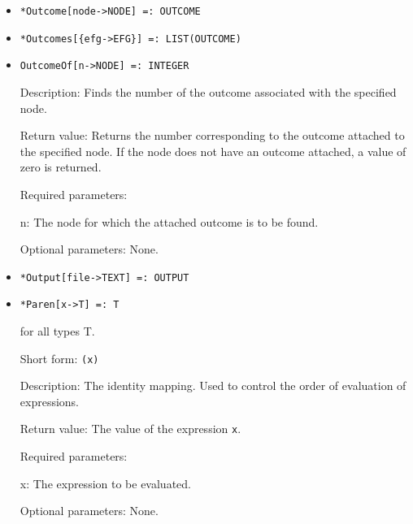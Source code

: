 \begin{itemize}
\item
\protect \large \begin{verbatim}
*Outcome[node->NODE] =: OUTCOME
\end{verbatim}\normalsize

\item
\protect \large \begin{verbatim}
*Outcomes[{efg->EFG}] =: LIST(OUTCOME)
\end{verbatim}\normalsize



\item
\protect \large \begin{verbatim}
OutcomeOf[n->NODE] =: INTEGER
\end{verbatim}\normalsize

\bd

\item
[Description:] Finds the number of the outcome associated with the
specified node.
\item
[Return value:] Returns the number corresponding to the outcome
attached to the specified node.  If the node does not have an outcome
attached, a value of zero is returned.
\item
[Required parameters:]\hfil\null
	
\bd
\item
[n:] The node for which the attached outcome is to be found.
\ed

\item
[Optional parameters:] None.
\ed

\item
\protect \large \begin{verbatim}
*Output[file->TEXT] =: OUTPUT
\end{verbatim}\normalsize



\item
\protect \large \begin{verbatim}
*Paren[x->T] =: T
\end{verbatim}\normalsize

for all types T.

\bd
\item
[Short form:] \verb+(x)+
\item
[Description:] The identity mapping.  Used to control the order of evaluation
of expressions.
\item
[Return value:] The value of the expression \verb+x+.
\item
[Required parameters:]\hfil\null
\bd
\item
[x:] The expression to be evaluated.
\ed
\item
[Optional parameters:] None.
\ed


\end{itemize}
